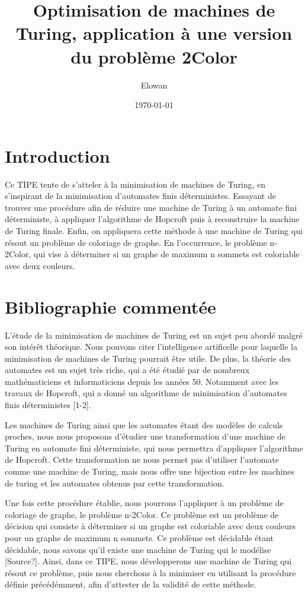 \documentclass{article}
\begin{document}
\title{Optimisation de machines de Turing, application à une version du problème 2Color}
\author{Elowan}
\date{\today}

\maketitle

\section{Introduction}
Ce TIPE tente de s'atteler à la minimisation de machines de Turing, en 
s'inspirant de la minimisation d'automates finis déterministes. Essayant
de trouver une procédure afin de réduire une machine de Turing à un automate
fini déterministe, à appliquer l'algorithme de Hopcroft puis à reconstruire
la machine de Turing finale. Enfin, on appliquera cette méthode à une machine
de Turing qui résout un problème de coloriage de graphe. En l'occurrence,
le problème n-2Color, qui vise à déterminer si un graphe de maximum n 
sommets est coloriable avec deux couleurs. 

\section{Bibliographie commentée}
L'étude de la minimisation de machines de Turing est un sujet peu abordé
malgré son intérêt théorique. Nous pouvons citer l'intelligence artificelle 
pour laquelle la minimisation de machines de Turing pourrait être utile.
De plus, la théorie des automates est un sujet très riche, qui a été étudié
par de nombreux mathématiciens et informaticiens depuis les années 50. Notamment
avec les travaux de Hopcroft, qui a donné un algorithme de minimisation 
d'automates finis déterministes [1-2]. 

Les machines de Turing ainsi que les automates étant des modèles de calculs 
proches, nous nous proposons d'étudier une transformation d'une machine de 
Turing en automate fini déterministe, qui nous permettra d'appliquer 
l'algorithme de Hopcroft. Cette transformation ne nous permet pas d'utiliser 
l'automate comme une machine de Turing, mais nous offre une bijection entre 
les machines de turing et les automates obtenus par cette transformation. 

Une fois cette procédure établie, nous pourrons l'appliquer à un problème de
coloriage de graphe, le problème n-2Color. Ce problème est un problème de
décision qui consiste à déterminer si un graphe est coloriable avec deux
couleurs pour un graphe de maximum n sommets. Ce problème est décidable étant 
décidable, nous savons qu'il existe une machine de Turing qui le modélise [Source?]. 
Ainsi, dans ce TIPE, nous développerons une machine de Turing qui résout ce
problème, puis nous cherchons à la minimiser en utilisant la procédure définie
précédémment, afin d'attester de la validité de cette méthode.
\end{document}
